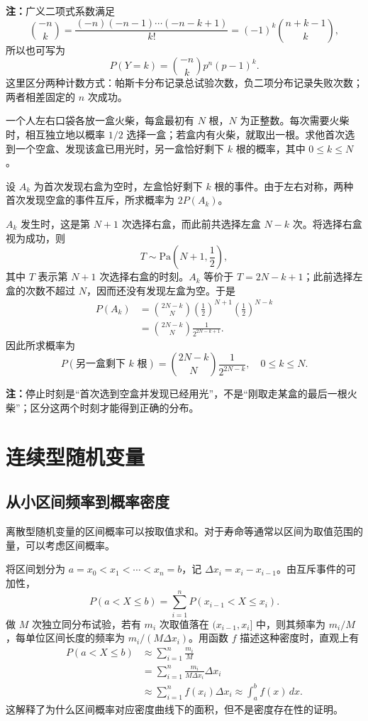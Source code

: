 \textbf{注：}\quad 广义二项式系数满足
\[
\binom{-n}{k}
=\frac{(-n)(-n-1)\cdots(-n-k+1)}{k!}
=(-1)^k\binom{n+k-1}{k},
\]
所以也可写为
\[
P(Y=k)=\binom{-n}{k}p^n(p-1)^k.
\]
这里区分两种计数方式：帕斯卡分布记录总试验次数，负二项分布记录失败次数；两者相差固定的 $n$ 次成功。

\begin{example}[巴拿赫火柴盒问题]
一个人左右口袋各放一盒火柴，每盒最初有 $N$ 根，$N$ 为正整数。每次需要火柴时，相互独立地以概率 $1/2$ 选择一盒；若盒内有火柴，就取出一根。求他首次选到一个空盒、发现该盒已用光时，另一盒恰好剩下 $k$ 根的概率，其中 $0\leq k\leq N$。

设 $A_k$ 为首次发现右盒为空时，左盒恰好剩下 $k$ 根的事件。由于左右对称，两种首次发现空盒的事件互斥，所求概率为 $2P(A_k)$。

$A_k$ 发生时，这是第 $N+1$ 次选择右盒，而此前共选择左盒 $N-k$ 次。将选择右盒视为成功，则
\[
T\sim\mathrm{Pa}\left(N+1,\frac12\right),
\]
其中 $T$ 表示第 $N+1$ 次选择右盒的时刻。$A_k$ 等价于 $T=2N-k+1$；此前选择左盒的次数不超过 $N$，因而还没有发现左盒为空。于是
\[
\begin{aligned}
P(A_k)
&=\binom{2N-k}{N}
\left(\frac12\right)^{N+1}
\left(\frac12\right)^{N-k}\\
&=\binom{2N-k}{N}\frac1{2^{2N-k+1}}.
\end{aligned}
\]
因此所求概率为
\[
\boxed{\,P(\text{另一盒剩下 }k\text{ 根})
=\binom{2N-k}{N}\frac1{2^{2N-k}},\quad 0\leq k\leq N.\,}
\]

\textbf{注：}\quad 停止时刻是“首次选到空盒并发现已经用光”，不是“刚取走某盒的最后一根火柴”；区分这两个时刻才能得到正确的分布。
\end{example}

\section{连续型随机变量}
\label{sec:continuous-random-variables}

\subsection*{从小区间频率到概率密度}

离散型随机变量的区间概率可以按取值求和。对于寿命等通常以区间为取值范围的量，可以考虑区间概率。

将区间划分为 $a=x_0<x_1<\cdots<x_n=b$，记 $\Delta x_i=x_i-x_{i-1}$。由互斥事件的可加性，
\[
P(a<X\leq b)=\sum_{i=1}^{n}P(x_{i-1}<X\leq x_i).
\]
做 $M$ 次独立同分布试验，若有 $m_i$ 次取值落在 $(x_{i-1},x_i]$ 中，则其频率为 $m_i/M$，每单位区间长度的频率为 $m_i/(M\Delta x_i)$。用函数 $f$ 描述这种密度时，直观上有
\[
\begin{aligned}
P(a<X\leq b)
&\approx\sum_{i=1}^{n}\frac{m_i}{M}\\
&=\sum_{i=1}^{n}\frac{m_i}{M\Delta x_i}\Delta x_i\\
&\approx\sum_{i=1}^{n}f(x_i)\Delta x_i
\approx\int_a^b f(x)\,dx.
\end{aligned}
\]
这解释了为什么区间概率对应密度曲线下的面积，但不是密度存在性的证明。

